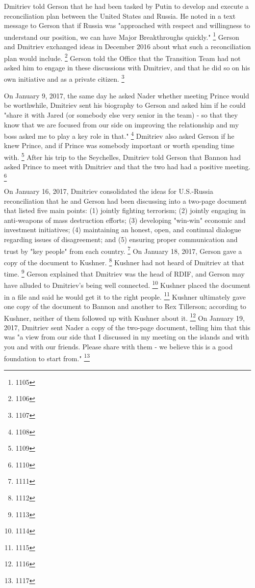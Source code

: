 Dmitriev told Gerson that he had been tasked by Putin to develop and execute a reconciliation plan between the United States and Russia.
He noted in a text message to Gerson that if Russia was "approached with respect and willingness to understand our position, we can have Major Breakthroughs quickly."%
\footnote{1105}
Gerson and Dmitriev exchanged ideas in December 2016 about what such a reconciliation plan would include.%
\footnote{1106}
Gerson told the Office that the Transition Team had not asked him to engage in these discussions with Dmitriev, and that he did so on his own initiative and as a private citizen.%
\footnote{1107}

On January 9, 2017, the same day he asked Nader whether meeting Prince would be worthwhile, Dmitriev sent his biography to Gerson and asked him if he could "share it with Jared (or somebody else very senior in the team) - so that they know that we are focused from our side on improving the relationship and my boss asked me to play a key role in that."%
\footnote{1108}
Dmitriev also asked Gerson if he knew Prince, and if Prince was somebody important or worth spending time with.%
\footnote{1109}
After his trip to the Seychelles, Dmitriev told Gerson that Bannon had asked Prince to meet with Dmitriev and that the two had had a positive meeting.%
\footnote{1110}

On January 16, 2017, Dmitriev consolidated the ideas for U.S.-Russia reconciliation that he and Gerson had been discussing into a two-page document that listed five main points:
(1) jointly fighting terrorism;
(2) jointly engaging in anti-weapons of mass destruction efforts;
(3) developing "win-win" economic and investment initiatives;
(4) maintaining an honest, open, and continual dialogue regarding issues of disagreement; and
(5) ensuring proper communication and trust by "key people" from each country.%
\footnote{1111}
On January 18, 2017, Gerson gave a copy of the document to Kushner.%
\footnote{1112}
Kushner had not heard of Dmitriev at that time.%
\footnote{1113}
Gerson explained that Dmitriev was the head of RDIF, and Gerson may have alluded to Dmitriev's being well connected.%
\footnote{1114}
Kushner placed the document in a file and said he would get it to the right people.%
\footnote{1115}
Kushner ultimately gave one copy of the document to Bannon and another to Rex Tillerson; according to Kushner, neither of them followed up with Kushner about it.%
\footnote{1116}
On January 19, 2017, Dmitriev sent Nader a copy of the two-page document, telling him that this was "a view from our side that I discussed in my meeting on the islands and with you and with our friends.
Please share with them - we believe this is a good foundation to start from."%
\footnote{1117}

